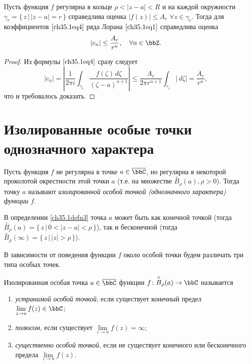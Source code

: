 \begin{cons}  \label{ch35.1cons3}
Пусть функция $f$ регулярна в кольце $\rho < |z - a| < R$ и на каждой окружности $\gamma_r = \{\, z \,\big|\, |z - a| = r\,\}$ справедлива оценка $|f(z)| \le A_r$ $ \forall z \in \gamma_r$. Тогда для коэффициентов $\eqref{ch35.1eq4}$ ряда Лорана $\eqref{ch35.1eq1}$ справедлива оценка
\begin{equation} \label{ch35.1eq20}
|c_n| \le \frac{A_r}{r^n}, \quad \forall n \in \bbZ.
\end{equation}
\end{cons}
\begin{proof}
Из формулы $\eqref{ch35.1eq4}$ сразу следует
$$
|c_n| = \left| \frac{1}{2\pi i} \int_{\gamma_r} \frac{f(\zeta)\,d\zeta}{(\zeta - a)^{n + 1}} \right| \le \frac{A_r}{2\pi r^{n + 1}} \int_{\gamma_r} |\,d\zeta| = \frac{A_r}{r^n},
$$
что и требовалось доказать.
\end{proof}


\section{Изолированные особые точки однозначного характера}

\begin{defn}\label{ch35.1defn3}
Пусть функция $f$ не регулярна в точке $a \in \overline{\bbC}$, но регулярна в некоторой проколотой окрестности этой точки $a$ (т.е. на множестве $\overset{\circ}{B}_\rho(a), \rho > 0$). Тогда точку $a$ называют \textit{изолированной особой точкой (однозначного характера) функции $f$}.
\end{defn}

В определении \ref{ch35.1defn3} точка $a$ может быть как конечной точкой (тогда $\overset{\circ}{B}_\rho(a) = \{\, z \,\big|\, 0 < |z - a| < \rho\,\}$), так и бесконечной (тогда $\overset{\circ}{B}_\rho(\infty) = \{\, z \,\big|\, |z| > \rho\,\}$).

В зависимости от поведения функции $f$ около особой точки будем различать три типа особых точек.

\begin{defn}
Изолированная особая точка $a \in \overline{\bbC}$ функции $f\colon \overset{\circ}{B}_\rho(a) \to \bbC$ называется
\begin{enumerate}
\item \textit{устранимой особой точкой}, если существует конечный предел $\lim\limits_{z \to a} f(z) \in \bbC$;
\item	\textit{полюсом}, если существует $\lim\limits_{z \to a} f(z) = \infty$;
\item \textit{существенно особой точкой}, если не существует конечного или бесконечного предела $\lim\limits_{z \to a} f(z)$.
\end{enumerate}
\end{defn}

